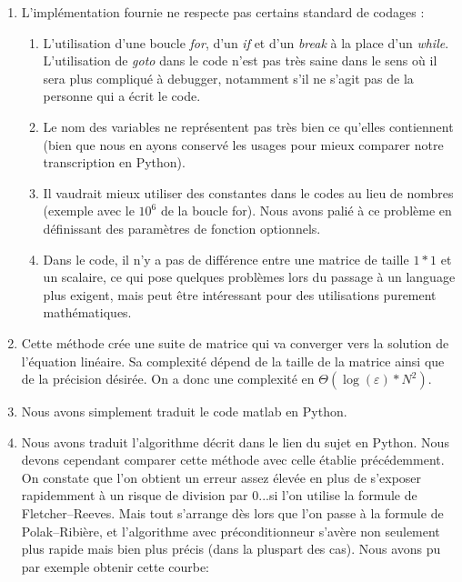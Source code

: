 \documentclass{article}
\begin{document}
\begin{enumerate}
\item L'implémentation fournie ne respecte pas certains standard de codages :
\begin{enumerate}
\item L'utilisation d'une boucle \textit{for}, d'un \textit{if} et d'un \textit{break} à la place d'un \textit{while}. L'utilisation de \textit{goto} dans le code n'est pas très saine dans le sens où il sera plus compliqué à debugger, notamment s'il ne s'agit pas de la personne qui a écrit le code.
\item Le nom des variables ne représentent pas très bien ce qu'elles contiennent (bien que nous en ayons conservé les usages pour mieux comparer notre transcription en Python).
\item Il vaudrait mieux utiliser des constantes dans le codes au lieu de nombres (exemple avec le $10^6$ de la boucle for). Nous avons palié à ce problème en définissant des paramètres de fonction optionnels.
\item Dans le code, il n'y a pas de différence entre une matrice de taille $1*1$ et un scalaire, ce qui pose quelques problèmes lors du passage à un language plus exigent, mais peut être intéressant pour des utilisations purement mathématiques.
\end{enumerate}
\item Cette méthode crée une suite de matrice qui va converger vers la solution de l'équation linéaire. Sa complexité dépend de la taille de la matrice ainsi que de la précision désirée. On a donc une complexité en $\Theta(\log(\varepsilon)*N^2)$.
\item Nous avons simplement traduit le code matlab en Python.
\item Nous avons traduit l'algorithme décrit dans le lien du sujet en Python. Nous devons cependant comparer cette méthode avec celle établie précédemment. On constate que l'on obtient un erreur assez élevée en plus de s'exposer rapidemment à un risque de division par $0$...si l'on utilise la formule de Fletcher–Reeves. Mais tout s'arrange dès lors que l'on passe à la formule de Polak–Ribière, et l'algorithme avec préconditionneur s'avère non seulement plus rapide mais bien plus précis (dans la pluspart des cas).
\newpage
Nous avons pu par exemple obtenir cette courbe:


\end{enumerate}
\end{document}
